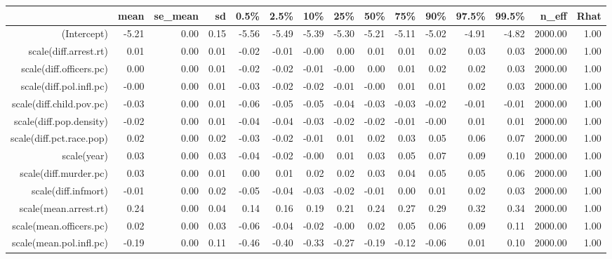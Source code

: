 \begin{table}[ht]
\centering
\begin{tabular}{rrrrrrrrrrrrrrr}
  \hline
 & mean & se\_mean & sd & 0.5\% & 2.5\% & 10\% & 25\% & 50\% & 75\% & 90\% & 97.5\% & 99.5\% & n\_eff & Rhat \\ 
  \hline
(Intercept) & -5.21 & 0.00 & 0.15 & -5.56 & -5.49 & -5.39 & -5.30 & -5.21 & -5.11 & -5.02 & -4.91 & -4.82 & 2000.00 & 1.00 \\ 
  scale(diff.arrest.rt) & 0.01 & 0.00 & 0.01 & -0.02 & -0.01 & -0.00 & 0.00 & 0.01 & 0.01 & 0.02 & 0.03 & 0.03 & 2000.00 & 1.00 \\ 
  scale(diff.officers.pc) & 0.00 & 0.00 & 0.01 & -0.02 & -0.02 & -0.01 & -0.00 & 0.00 & 0.01 & 0.02 & 0.02 & 0.03 & 2000.00 & 1.00 \\ 
  scale(diff.pol.infl.pc) & -0.00 & 0.00 & 0.01 & -0.03 & -0.02 & -0.02 & -0.01 & -0.00 & 0.01 & 0.01 & 0.02 & 0.03 & 2000.00 & 1.00 \\ 
  scale(diff.child.pov.pc) & -0.03 & 0.00 & 0.01 & -0.06 & -0.05 & -0.05 & -0.04 & -0.03 & -0.03 & -0.02 & -0.01 & -0.01 & 2000.00 & 1.00 \\ 
  scale(diff.pop.density) & -0.02 & 0.00 & 0.01 & -0.04 & -0.04 & -0.03 & -0.02 & -0.02 & -0.01 & -0.00 & 0.01 & 0.01 & 2000.00 & 1.00 \\ 
  scale(diff.pct.race.pop) & 0.02 & 0.00 & 0.02 & -0.03 & -0.02 & -0.01 & 0.01 & 0.02 & 0.03 & 0.05 & 0.06 & 0.07 & 2000.00 & 1.00 \\ 
  scale(year) & 0.03 & 0.00 & 0.03 & -0.04 & -0.02 & -0.00 & 0.01 & 0.03 & 0.05 & 0.07 & 0.09 & 0.10 & 2000.00 & 1.00 \\ 
  scale(diff.murder.pc) & 0.03 & 0.00 & 0.01 & 0.00 & 0.01 & 0.02 & 0.02 & 0.03 & 0.04 & 0.05 & 0.05 & 0.06 & 2000.00 & 1.00 \\ 
  scale(diff.infmort) & -0.01 & 0.00 & 0.02 & -0.05 & -0.04 & -0.03 & -0.02 & -0.01 & 0.00 & 0.01 & 0.02 & 0.03 & 2000.00 & 1.00 \\ 
  scale(mean.arrest.rt) & 0.24 & 0.00 & 0.04 & 0.14 & 0.16 & 0.19 & 0.21 & 0.24 & 0.27 & 0.29 & 0.32 & 0.34 & 2000.00 & 1.00 \\ 
  scale(mean.officers.pc) & 0.02 & 0.00 & 0.03 & -0.06 & -0.04 & -0.02 & -0.00 & 0.02 & 0.05 & 0.06 & 0.09 & 0.11 & 2000.00 & 1.00 \\ 
  scale(mean.pol.infl.pc) & -0.19 & 0.00 & 0.11 & -0.46 & -0.40 & -0.33 & -0.27 & -0.19 & -0.12 & -0.06 & 0.01 & 0.10 & 2000.00 & 1.00 \\ 

\end{tabular}
\end{table}
